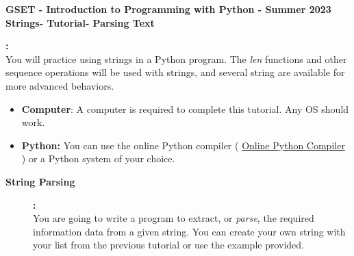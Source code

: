 \documentclass[12pt]{article}
\newcommand{\MNUM}{5} %
\newcommand{\MNAME}{Strings} %
\newcommand{\TNAME}{Parsing Text} %
\begin{document}
\thispagestyle{plain}

\begin{center}
   {\bf \large GSET - Introduction to Programming with Python - Summer 2023} \vspace{5mm}\\
   {\bf \Large \MNAME \hspc -  Tutorial\hspc\MNUM\hspc - \TNAME}\vspace{3mm}\\
   
\end{center}


\begin{description}[labelindent=1cm]
	
	\item [\textbf{ \Large Overview}] \textbf{ \Large :}\\
	You will practice using strings in a Python program. The {\it len} functions and other sequence operations will be used with strings, and several string are available for more advanced behaviors. 	
	\item[\textbf{\underline{System Requirements:}}] \hfill \vspace{0mm}

\begin{itemize}
	\item {\bf Computer}: A computer is required to complete this tutorial. Any OS should work.
	\item {\bf Python:} You can use the online Python compiler ( \href{https://www.online-python.com/online_python_compiler}{Online Python Compiler}  ) or a Python system of your choice.
\end{itemize}

	\item[\textbf{\underline{Background:}}] \hfill \vspace{0mm}
	
	\begin{description}

	 	\item [\textbf{String Parsing }] \textbf{ \Large :}\\   

            You are going to write a program to extract, or {\it parse}, the required information data from a given string. You can create your own string with your list from the previous tutorial or use the example provided. 
      

\end{description}
\end{description}
\end{document}
